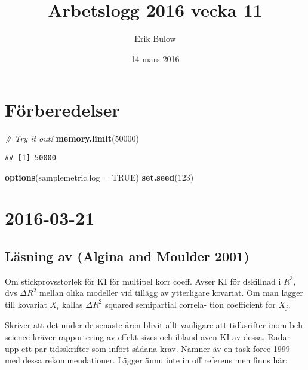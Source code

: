 \documentclass[]{article}
\title{Arbetslogg 2016 vecka 11}
\author{Erik Bulow}
\date{14 mars 2016}
\newenvironment{Shaded}{\begin{snugshade}}{\end{snugshade}}
\newcommand{\KeywordTok}[1]{\textcolor[rgb]{0.13,0.29,0.53}{\textbf{{#1}}}}
\newcommand{\DataTypeTok}[1]{\textcolor[rgb]{0.13,0.29,0.53}{{#1}}}
\newcommand{\DecValTok}[1]{\textcolor[rgb]{0.00,0.00,0.81}{{#1}}}
\newcommand{\CommentTok}[1]{\textcolor[rgb]{0.56,0.35,0.01}{\textit{{#1}}}}
\newcommand{\OtherTok}[1]{\textcolor[rgb]{0.56,0.35,0.01}{{#1}}}
\newcommand{\NormalTok}[1]{{#1}}
\begin{document}
\maketitle

{
\setcounter{tocdepth}{2}
\tableofcontents
}
\section{Förberedelser}\label{forberedelser}

\begin{Shaded}
\begin{Highlighting}[]
\CommentTok{# Try it out!}
\KeywordTok{memory.limit}\NormalTok{(}\DecValTok{50000}\NormalTok{)}
\end{Highlighting}
\end{Shaded}

\begin{verbatim}
## [1] 50000
\end{verbatim}

\begin{Shaded}
\begin{Highlighting}[]
\KeywordTok{options}\NormalTok{(}\DataTypeTok{samplemetric.log =} \OtherTok{TRUE}\NormalTok{)}
\KeywordTok{set.seed}\NormalTok{(}\DecValTok{123}\NormalTok{)}
\end{Highlighting}
\end{Shaded}

\section{2016-03-21}\label{section}

\subsection{Läsning av (Algina and Moulder
2001)}\label{lasning-av-algina2001}

Om stickprovsstorlek för KI för multipel korr coeff. Avser KI för
dskillnad i \(R^3\), dvs \(\Delta R^2\) mellan olika modeller vid
tillägg av ytterligare kovariat. Om man lägger till kovariat \(X_i\)
kallas \(\Delta R^2\) squared semipartial correla- tion coefficient for
\(X_j\).

Skriver att det under de senaste åren blivit allt vanligare att
tidksrifter inom beh science kräver rapportering av effekt sizes och
ibland även KI av dessa. Radar upp ett par tidsskrifter som infört
sådana krav. Nämner äv en task force 1999 med dessa rekommendationer.
Lägger ännu inte in off referens men finns här:
\end{document}
